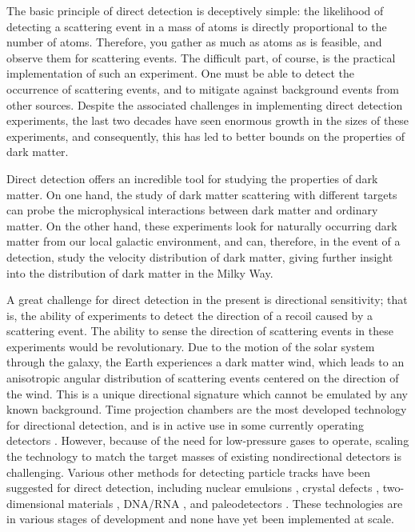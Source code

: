 The basic principle of direct detection is deceptively simple: the likelihood of detecting a scattering event in a mass of atoms is directly proportional to the number of atoms. Therefore, you gather as much as atoms as is feasible, and observe them for scattering events. The difficult part, of course, is the practical implementation of such an experiment. One must be able to detect the occurrence of scattering events, and to mitigate against background events from other sources. Despite the associated challenges in implementing direct detection experiments, the last two decades have seen enormous growth in the sizes of these experiments, and consequently, this has led to better bounds on the properties of dark matter.

Direct detection offers an incredible tool for studying the properties of dark matter. On one hand, the study of dark matter scattering with different targets can probe the microphysical interactions between dark matter and ordinary matter. On the other hand, these experiments look for naturally occurring dark matter from our local galactic environment, and can, therefore, in the event of a detection, study the velocity distribution of dark matter, giving further insight into the distribution of dark matter in the Milky Way.

A great challenge for direct detection in the present is directional sensitivity; that is, the ability of experiments to detect the direction of a recoil caused by a scattering event. The ability to sense the direction of scattering events in these experiments would be revolutionary. Due to the motion of the solar system through the galaxy, the Earth experiences a dark matter wind, which leads to an anisotropic angular distribution of scattering events centered on the direction of the wind. This is a unique directional signature which cannot be emulated by any known background. Time projection chambers are the most developed technology for directional detection, and is in active use in some currently operating detectors \parencites{BattatEtAl2017, IkedaEtAl2021}. However, because of the need for low-pressure gases to operate, scaling the technology to match the target masses of existing nondirectional detectors is challenging. Various other methods for detecting particle tracks have been suggested for direct detection, including nuclear emulsions \parencite{AgafonovaEtAl2018}, crystal defects \parencites{RajendranEtAl2017, MarshallEtAl2021}, two-dimensional materials \parencites{CapparelliEtAl2015, MarshallEtAl2021, BaracchiniEtAl2018}, DNA/RNA \parencites{DrukierEtAl2012, OHareEtAl2022}, and paleodetectors \parencite{BaumEtAl2020}. These technologies are in various stages of development and none have yet been implemented at scale.

